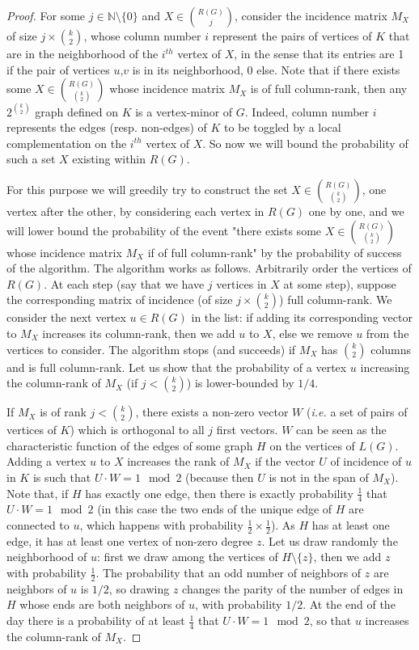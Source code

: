\documentclass[a4paper,UKenglish,cleveref, autoref, thm-restate]{arxiv}
\newcommand{\sm}{\setminus}
\begin{document}
\begin{proof}
    For some $j \in \mathbb N\setminus\{0\}$ and $X \in {R(G) \choose j}$, consider the incidence matrix $M_X$ of size $j \times {k \choose 2}$, whose column number $i$ represent the pairs of vertices of $K$ that are in the neighborhood of the $i^{th}$ vertex of $X$, in the sense that its entries are 1 if the pair of vertices $u$,$v$ is in its neighborhood, 0 else. Note that if there exists some $X \in {R(G) \choose {k \choose 2}}$ whose incidence matrix $M_X$ is of full column-rank, then any $2^{{k \choose 2}}$ graph defined on $K$ is a vertex-minor of $G$. Indeed, column number $i$ represents the edges (resp. non-edges) of $K$ to be toggled by a local complementation on the $i^{th}$ vertex of $X$. So now we will bound the probability of such a set $X$ existing within $R(G)$.

    For this purpose we will greedily try to construct the set $X \in {R(G) \choose {k \choose 2}}$, one vertex after the other, by considering each vertex in $R(G)$ one by one, and we will lower bound the probability of the event "there exists some $X \in {R(G) \choose {k \choose 2}}$ whose incidence matrix $M_X$ if of full column-rank" by the probability of success of the algorithm. The algorithm works as follows. Arbitrarily order the vertices of $R(G)$. At each step (say that we have $j$ vertices in $X$ at some step), suppose the corresponding matrix of incidence (of size $j \times {k \choose 2}$) full column-rank. We consider the next vertex $u \in R(G)$ in the list: if adding its corresponding vector to $M_X$ increases its column-rank, then we add $u$ to $X$, else we remove $u$ from the vertices to consider. The algorithm stops (and succeeds) if $M_X$ has ${k \choose 2}$ columns and is full column-rank. Let us show that the probability of a vertex $u$ increasing the column-rank of $M_X$ (if $j < {k \choose 2}$) is lower-bounded by $1/4$. 

    If $M_X$ is of rank $j < {k \choose 2}$, there exists a non-zero vector $W$ (\emph{i.e.} a set of pairs of vertices of $K$) which is orthogonal to all $j$ first vectors. $W$ can be seen as the characteristic function of the edges of some graph $H$ on the vertices of $L(G)$. Adding a vertex $u$ to $X$ increases the rank of $M_X$ if the vector $U$ of incidence of $u$ in $K$ is such that $U \cdot W = 1 \mod 2$ (because then $U$ is not in the span of $M_X$). Note that, if $H$ has exactly one edge, then there is exactly probability $\frac{1}{4}$ that $U \cdot W = 1 \mod 2$ (in this case the two ends of the unique edge of $H$ are connected to $u$, which happens with probability $\frac{1}{2} \times \frac{1}{2}$). As $H$ has at least one edge, it has at least one vertex of non-zero degree $z$. Let us draw randomly the neighborhood of $u$: first we draw among the vertices of $H\sm\{z\}$, then we add $z$ with probability $\frac{1}{2}$. The probability that an odd number of neighbors of $z$ are neighbors of $u$ is $1/2$, so drawing $z$ changes the parity of the number of edges in $H$ whose ends are both neighbors of $u$, with probability $1/2$. At the end of the day there is a probability of at least $\frac{1}{4}$ that $U \cdot W = 1 \mod 2$, so that $u$ increases the column-rank of $M_X$.
    

\end{proof}
\end{document}

